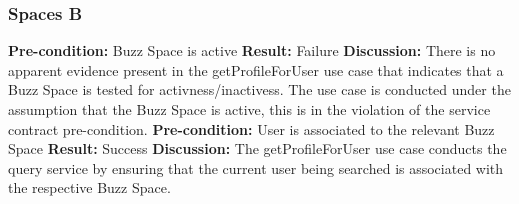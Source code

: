 \subsubsection{Spaces B}
\textbf{Pre-condition:}  Buzz Space is active \newline
\textbf{Result:}  Failure \newline
\textbf{Discussion:}  There is no apparent evidence present in the getProfileForUser use case that indicates that a Buzz Space is tested for activness/inactivess.
The use case is conducted under the assumption that the Buzz Space is active, this is in the violation of the service contract pre-condition. \newline \newline
\textbf{Pre-condition:}  User is associated to the relevant Buzz Space\newline
\textbf{Result:}  Success \newline
\textbf{Discussion:}  The getProfileForUser use case conducts the query service by ensuring that the current user being searched is associated with the respective Buzz Space.


